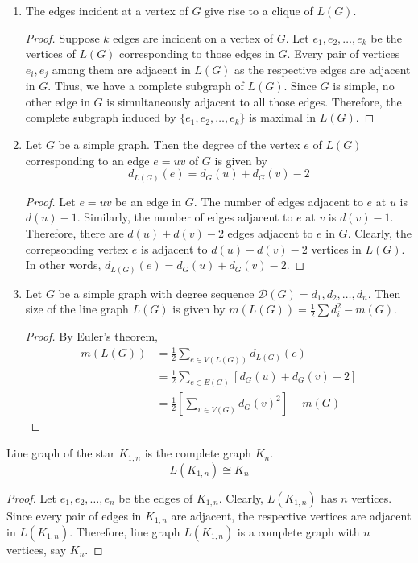 \begin{enumerate}
\begin{proof}
		Two vertices in $L(H)$ are adjacent if the corresponding edges are adjacent in $H$. Clearly, these edges are adjacent in $G$ as well. Therefore, the vertices are adjacent in $L(G)$ as well. That is, $E(L(H)) \subset E(L(G))$. Therefore $L(H)$ is a subgraph of $L(G)$.
	\end{proof}
	\item The edges incident at a vertex of $G$ give rise to a clique of $L(G)$.
	\begin{proof}
		Suppose $k$ edges are incident on a vertex of $G$. Let $e_1,e_2,\dots,e_k$ be the vertices of $L(G)$ corresponding to those edges in $G$. Every pair of vertices $e_i, e_j$ among them are adjacent in $L(G)$ as the respective edges are adjacent in $G$. Thus, we have a complete subgraph of $L(G)$. Since $G$ is simple, no other edge in $G$ is simultaneously adjacent to all those edges. Therefore, the complete subgraph induced by $\{ e_1,e_2,\dots,e_k \}$ is maximal in $L(G)$.
	\end{proof}
\item Let $G$ be a simple graph. Then the degree of the vertex $e$ of $L(G)$ corresponding to an edge $e = uv$ of $G$ is given by
		$$d_{L(G)}(e) = d_G(u) + d_G(v) - 2$$
	\begin{proof}
		Let $e = uv$ be an edge in $G$. The number of edges adjacent to $e$ at $u$ is $d(u)-1$. Similarly, the number of edges adjacent to $e$ at $v$ is $d(v)-1$. Therefore, there are $d(u)+d(v)-2$ edges adjacent to $e$ in $G$. Clearly, the correpsonding vertex $e$ is adjacent to $d(u)+d(v)-2$ vertices in $L(G)$. In other words, $d_{L(G)}(e) = d_G(u)+d_G(v)-2$.
	\end{proof}
	\item Let $G$ be a simple graph with degree sequence $\mathscr{D}(G) = d_1,d_2,\dots,d_n$.
		Then size of the line graph $L(G)$ is given by $m(L(G)) = \frac{1}{2} \sum d_i^2 - m(G)$.
	\begin{proof}
	By Euler's theorem,
	\begin{align*}
		m(L(G)) 
		& = \frac{1}{2} \sum_{e \in V(L(G))} d_{L(G)}(e) \\
		& = \frac{1}{2} \sum_{e \in E(G)} \left[ d_G(u)+d_G(v)-2 \right] \\
		& = \frac{1}{2} \left[ \sum_{v \in V(G)} d_G(v)^2 \right] - m(G) 
	\end{align*}
	\end{proof}
\end{enumerate}

\begin{exercise}
	Line graph of the star $K_{1,n}$ is the complete graph $K_n$.
	$$L(K_{1,n}) \cong K_n$$
\end{exercise}
\begin{proof}
	Let $e_1,e_2,\dots,e_n$ be the edges of $K_{1,n}$.
	Clearly, $L(K_{1,n})$ has $n$ vertices.
	Since every pair of edges in $K_{1,n}$ are adjacent, the respective vertices are adjacent in $L(K_{1,n})$.
	Therefore, line graph $L(K_{1,n})$ is a complete graph with $n$ vertices, say $K_n$.
\end{proof}

